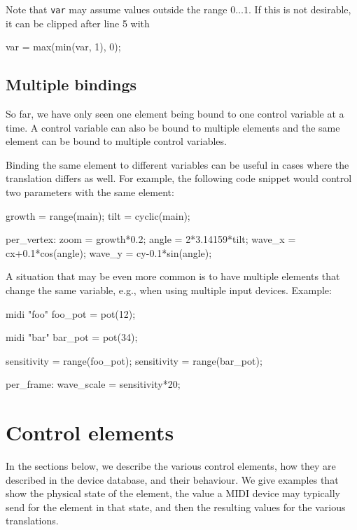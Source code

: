 \documentclass[11pt,a4paper]{article}
\begin{document}
Note that {\tt var} may assume values outside the range $0\ldots 1$.
If this is not desirable, it can be clipped after line 5 with

\begin{listing}{1}
	var = max(min(var, 1), 0);
\end{listing}




\subsection{Multiple bindings}

So far, we have only seen one element being bound to one control
variable at a time. A control variable can also be bound to
multiple elements and the same element can be bound to multiple
control variables.

Binding the same element to different variables can be useful in
cases where the translation differs as well. For example, the
following code snippet would control two parameters with the same
element:

\begin{listing}{1}
growth = range(main);
tilt = cyclic(main);

per_vertex:
	zoom = growth*0.2;
	angle = 2*3.14159*tilt;
	wave_x = cx+0.1*cos(angle);
	wave_y = cy-0.1*sin(angle);
\end{listing}

A situation that may be even more common is to have multiple elements
that change the same variable, e.g., when using multiple input
devices. Example:

\begin{listing}{1}
midi "foo" {
        foo_pot = pot(12);
}

midi "bar" {
        bar_pot = pot(34);
}

sensitivity = range(foo_pot);
sensitivity = range(bar_pot);

per_frame:
	wave_scale = sensitivity*20;
\end{listing}




\section{Control elements}
\label{controls}

In the sections below, we describe the various control elements, how
they are described in the device database, and their behaviour. We
give examples that show the physical state of the element, the value
a MIDI device may typically send for the element in that state, and
then the resulting values for the various translations.
\end{document}
